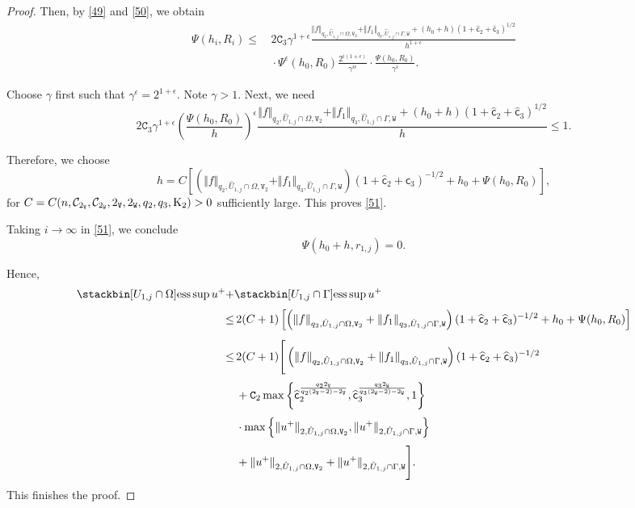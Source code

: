 \documentclass[reqno, 11pt, a4paper]{amsart}
\numberwithin{equation}{section}
\newcommand{\xv}{2_{\mathtt{V}}}
\newcommand{\xw}{2_{\mathtt{W}}}
\newcommand{\ck}{\textnormal K}
\newcommand{\fc}{\mathsf c}
\newcommand{\wghtv}{\mathtt{V}}
\newcommand{\wghtw}{\mathtt{W}}
\newcommand{\qxp}{q}
\newcommand{\cen}{\mathtt{C}}
\begin{document}
\begin{proof}
Then, by \eqref{49} and \eqref{50}, we obtain
\begin{align*}
\Psi (h_{i},  R_i) 
 \leq & \, \displaystyle  2\cen _3 \gamma^{1+\epsilon } \frac{  \Vert f \Vert _{ q_2 ,  \hat U _{1,j} \cap \Omega  , \wghtv _2}  + \Vert f_1 \Vert _{q_3 , \hat U _{1,j} \cap \Gamma , \wghtw} +( h _0 + h  )(1+\widehat{\fc}_2 + \widehat{\fc}_3)^{1/2} }{h^{1+\epsilon }} \\[3pt]
 & \, \displaystyle \cdot \Psi ^\epsilon (h_0, R_0)  \frac{2^{i (1+\epsilon )}}{\gamma^{i \epsilon }} \cdot \frac{\Psi ( h_0, R_0 )}{\gamma^{i}} .
\end{align*}

Choose $\gamma$ first such that $\gamma^{\epsilon }=2^{1+\epsilon }$. Note $\gamma>1$. Next, we need
$$
2\cen _3 \gamma^{1+\epsilon } \left(\frac{\Psi (h_0, R_0)}{h}\right)^{\epsilon }   \frac{  \Vert f \Vert _{ q_2 ,  \hat U _{1,j} \cap \Omega  , \wghtv _2}  + \Vert f_1 \Vert _{q_3 , \hat U _{1,j} \cap \Gamma , \wghtw} + (h _0 + h )(1+\widehat{\fc}_2 + \widehat{\fc}_3)^{1/2}  }{h} \leq 1 .
$$

Therefore, we choose
$$
h=C \left[   \left(\Vert f \Vert _{ q_2 ,  \hat U _{1,j} \cap \Omega  , \wghtv _2}  + \Vert f_1 \Vert _{q_3 , \hat U _{1,j} \cap \Gamma , \wghtw}\right)(1+\widehat{\fc}_2 + \widehat{\fc}_3)^{-1/2} + h _0   + \Psi ( h_0 , R_0) \right],
$$
for $C= C (  n , \mathcal C_{\xv} , \mathcal C_{\xw} ,  \xv , \xw , \qxp _2 , \qxp _3 , \ck _2) >0$ sufficiently large. This proves \eqref{51}.


Taking \( i \rightarrow \infty \) in \eqref{51}, we conclude
$$
\Psi (h_0 + h , r_{1,j} )=0.
$$

Hence, 
\begin{align*}
 \stackbin[ U_{1,j }\cap \Omega ]{}{\operatorname{ess}\sup} \,  u^{+} + & \stackbin[ U _{1,j} \cap \Gamma   ]{}{\operatorname{ess}\sup} \, u^{+} \\[3pt]
 \leq & \displaystyle \,  2  (C+1)\left[ \left( \Vert f \Vert _{ q_2 ,  \hat U _{1,j} \cap \Omega  , \wghtv _2}  + \Vert f_1 \Vert _{q_3 , \hat U _{1,j} \cap \Gamma , \wghtw} \right)(1+\widehat{\fc}_2 + \widehat{\fc}_3)^{-1/2}+ h _0   + \Psi ( h_0 , R_0) \right]\\[5pt]
 \leq & \displaystyle \,  2 (C+1)\Bigg[\left( \Vert f \Vert _{ q_2 ,  \hat U _{1,j} \cap \Omega  , \wghtv _2}  + \Vert f_1 \Vert _{q_3 , \hat U _{1,j} \cap \Gamma , \wghtw}\right)(1+\widehat{\fc}_2 + \widehat{\fc}_3)^{-1/2} \\[3pt]
& \displaystyle \, + \cen _2 \max \left\{ \widehat{\fc}_2 ^{\frac{\qxp _2 \xv }{\qxp _2 (\xv -2) - \xv}}   , \widehat{\fc}_3^{\frac{\qxp _3 \xw }{\qxp _3 (\xw -2) - \xw}} , 1 \right\}  \\[3pt]
& \displaystyle \, \cdot \max \left\{ \Vert u^+ \Vert _{2 , \hat U _{1,j} \cap \Omega  , \wghtv _2 }  ,   \Vert  u^+ \Vert _{2 , \hat U _{1,j} \cap \Gamma , \wghtw }   \right\}   \\[3pt]
& \displaystyle \, + \Vert u^+ \Vert _{2 , \hat U _{1,j} \cap \Omega  , \wghtv _2}  +   \Vert  u^+ \Vert _{2 , \hat U _{1,j} \cap \Gamma , \wghtw }   \Bigg].
\end{align*}
This finishes the proof. \end{proof}
\end{document}
